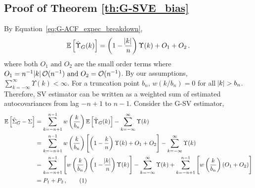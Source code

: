 \documentclass[11pt]{article}
\newcommand{\Var}{\text{Var}}
\newcommand\numberthis{\addtocounter{equation}{1}\tag{\theequation}}
\theoremstyle{remark}
\begin{document}
\subsection{Proof of Theorem \ref{th:G-SVE_bias}}

By Equation~\ref{eq:G-ACF_expec_breakdown},
%
%
\[
\mathbb{E} \left[\hat{\Upsilon}_{G}(k) \right] = \left(1 - \dfrac{\abs{k}}{n}\right)\Upsilon(k) + O_1 + O_2    \,.
\]
%
where both $O_1 \textrm{ and } O_2$ are the small order terms where $O_1 = n^{-1}\abs{k} \mathcal{O}(n^{-1}) \text{ and } O_2 = \mathcal{O}(n^{-1})$. By our assumptions, $\sum_{k=-\infty}^{\infty}\Upsilon(k) < \infty$.  
For a truncation point $b_n$, $w(k/b_n)=0$ for all $\abs{k} > b_n$. Therefore, SV estimator can be written as a weighted sum of estimated autocovariances from lag $-n+1$ to $n-1$. Consider the G-SV estimator,
\begin{align*}
 \mathbb{E} \left[\hat{\Sigma}_{G} - \Sigma \right] & = \sum_{k=-n+1}^{n-1} w\left(\dfrac{k}{b_n}\right)\mathbb{E} \left[\hat{\Upsilon}_{G}(k) \right] - \sum_{k=-\infty}^{\infty}\Upsilon(k)\\
    &= \sum_{k=-n+1}^{n-1}  w\left(\dfrac{k}{b_n}\right)\left[\left(1-\dfrac{k}{n}\right)\Upsilon(k) + O_1 + O_2 \right]  - \sum_{k=-\infty}^{\infty}\Upsilon(k)\\
    &= \sum_{k=-n+1}^{n-1} \left[ w\left(\dfrac{k}{b_n}\right)\left(1-\dfrac{\abs{k}}{n}\right)\Upsilon(k)\right]  - \sum_{k=-\infty}^{\infty}\Upsilon(k) + \sum_{k=-n+1}^{n-1}\left[  w\left(\dfrac{k}{b_n}\right)  (O_1 + O_2) \right] \\ 
    & = P_1 + P_2\,, \numberthis \label{eq:bias_gsve}
\end{align*}
\end{document}
